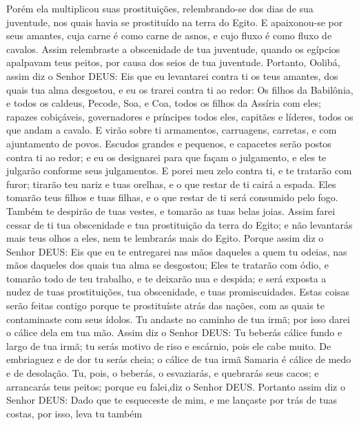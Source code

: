 {Porém ela multiplicou suas prostituições, relembrando-se dos dias de sua juventude, nos quais havia se prostituído na terra do Egito.
E apaixonou-se por seus amantes, cuja carne é como carne de asnos, e cujo fluxo é como fluxo de cavalos.
Assim relembraste a obscenidade de tua juventude, quando os egípcios apalpavam teus peitos, por causa dos seios de tua juventude.
Portanto, Oolibá, assim diz o Senhor DEUS: Eis que eu levantarei contra ti os teus amantes, dos quais tua alma desgostou, e eu os trarei contra ti ao redor:
Os filhos da Babilônia, e todos os caldeus, Pecode, Soa, e Coa, todos os filhos da Assíria com eles; rapazes cobiçáveis, governadores e príncipes todos eles, capitães e líderes, todos os que andam a cavalo.
E virão sobre ti
{} armamentos,
 carruagens, carretas, e com ajuntamento de povos. Escudos grandes e pequenos, e capacetes serão postos contra ti ao redor; e eu os designarei para que façam o julgamento,
 e eles te julgarão conforme seus julgamentos.
E porei meu zelo contra ti, e te tratarão com furor; tirarão teu nariz e tuas orelhas, e o que restar de ti cairá a espada. Eles tomarão teus filhos e tuas filhas, e o que restar de ti será consumido pelo fogo.
Também te despirão de tuas vestes, e tomarão as tuas belas joias.
Assim farei cessar de ti tua obscenidade e tua prostituição da terra do Egito; e não levantarás mais teus olhos a eles, nem te lembrarás mais do Egito.
Porque assim diz o Senhor DEUS: Eis que eu te entregarei nas mãos daqueles a quem tu odeias, nas mãos daqueles dos quais tua alma se desgostou;
Eles te tratarão com ódio, e tomarão todo
{} de teu trabalho, e te deixarão nua e despida; e será exposta a nudez de tuas prostituições, tua obscenidade, e tuas promiscuidades.
Estas coisas serão feitas contigo porque te prostituíste atrás das nações, com as quais te contaminaste com seus ídolos.
Tu andaste no caminho de tua irmã; por isso darei o cálice dela em tua mão.
Assim diz o Senhor DEUS: Tu beberás cálice fundo e largo de tua irmã; tu serás motivo de riso e escárnio, pois ele cabe muito.
De embriaguez e de dor tu serás cheia; o cálice de tua irmã Samaria é cálice de medo e de desolação.
Tu, pois, o beberás, o esvaziarás, e quebrarás seus cacos; e arrancarás teus peitos; porque eu falei,diz o Senhor DEUS.
Portanto assim diz o Senhor DEUS: Dado que te esqueceste de mim, e me lançaste por trás de tuas costas, por isso, leva tu também
}
